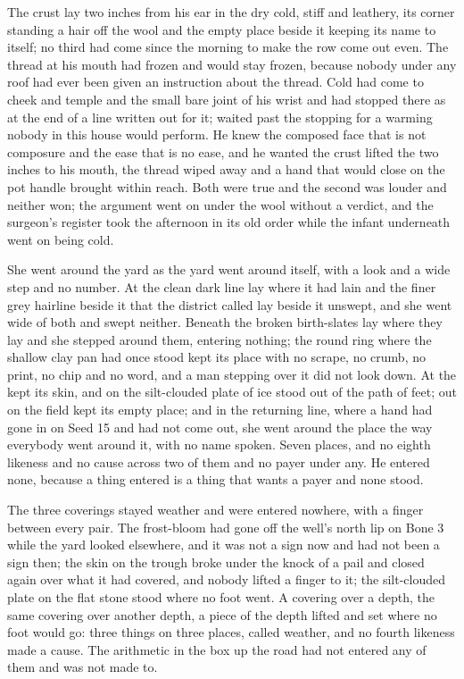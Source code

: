 The crust lay two inches from his ear in the dry cold, stiff and leathery, its corner standing a hair off the wool and the empty place beside it keeping its name to itself; no third had come since the morning to make the row come out even. The thread at his mouth had frozen and would stay frozen, because nobody under any roof had ever been given an instruction about the thread. Cold had come to cheek and temple and the small bare joint of his wrist and had stopped there as at the end of a line written out for it;  waited past the stopping for a warming nobody in this house would perform. He knew the composed face that is not composure and the ease that is no ease, and he wanted the crust lifted the two inches to his mouth, the thread wiped away and a hand that would close on the pot handle brought within reach. Both were true and the second was louder and neither won; the argument went on under the wool without a verdict, and the surgeon's register took the afternoon in its old order while the infant underneath went on being cold.

She went around the yard as the yard went around itself, with a look and a wide step and no number. At  the clean dark line lay where it had lain and the finer grey hairline beside it that the district called  lay beside it unswept, and she went wide of both and swept neither. Beneath  the broken birth-slates lay where they lay and she stepped around them, entering nothing; the round ring where the shallow clay pan had once stood kept its place with no scrape, no crumb, no print, no chip and no word, and a man stepping over it did not look down. At  the  kept its skin, and on  the silt-clouded plate of ice stood out of the path of feet; out on  the field kept its empty place; and in the returning line, where a hand had gone in on Seed 15 and had not come out, she went around the place the way everybody went around it, with no name spoken. Seven places, and no eighth likeness and no cause across two of them and no payer under any. He entered none, because a thing entered is a thing that wants a payer and none stood.

The three coverings stayed weather and were entered nowhere, with a finger between every pair. The frost-bloom had gone off the well's north lip on Bone 3 while the yard looked elsewhere, and it was not a sign now and had not been a sign then; the skin on the trough broke under the knock of a pail and closed again over what it had covered, and nobody lifted a finger to it; the silt-clouded plate on the flat stone stood where no foot went. A covering over a depth, the same covering over another depth, a piece of the depth lifted and set where no foot would go: three things on three places, called weather, and no fourth likeness made a cause. The arithmetic in the box up the road had not entered any of them and was not made to.

